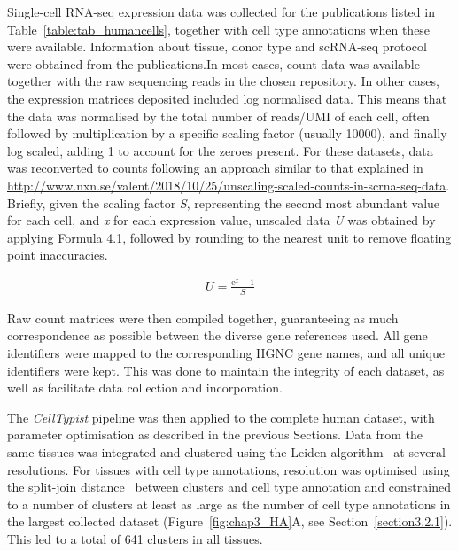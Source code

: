 Single-cell RNA-seq expression data was collected for the publications listed in Table~\ref{table:tab_humancells}, together with cell type annotations when these were available. Information about tissue, donor type and scRNA-seq protocol were obtained from the publications.In most cases, count data was available together with the raw sequencing reads in the chosen repository. In other cases, the expression matrices deposited included log normalised data. This means that the data was normalised by the total number of reads/UMI of each cell, often followed by multiplication by a specific scaling factor (usually 10000), and finally log scaled, adding 1 to account for the zeroes present. For these datasets, data was reconverted to counts following an approach similar to that explained in \url{http://www.nxn.se/valent/2018/10/25/unscaling-scaled-counts-in-scrna-seq-data}. Briefly, given the scaling factor \textit{S}, representing the second most abundant value for each cell, and \textit{x} for each expression value, unscaled data \textit{U} was obtained by applying Formula 4.1, followed by rounding to the nearest unit to remove floating point inaccuracies.

\begin{align}
U = \frac{\mathrm{e}^{x} - 1}{S}
\end{align}

Raw count matrices were then compiled together, guaranteeing as much correspondence as possible between the diverse gene references used. All gene identifiers were mapped to the corresponding HGNC gene names, and all unique identifiers were kept. This was done to maintain the integrity of each dataset, as well as facilitate data collection and incorporation.

The \textit{CellTypist} pipeline was then applied to the complete human dataset, with parameter optimisation as described in the previous Sections. Data from the same tissues was integrated and clustered using the Leiden algorithm~\citep{traag_louvain_2019} at several resolutions. For tissues with cell type annotations, resolution was optimised using the split-join distance~\citep{dongen_performance_2000} between clusters and cell type annotation and constrained to a number of clusters at least as large as the number of cell type annotations in the largest collected dataset (Figure~\ref{fig:chap3_HA}A, see Section~\ref{section3.2.1}). This led to a total of 641 clusters in all tissues.

